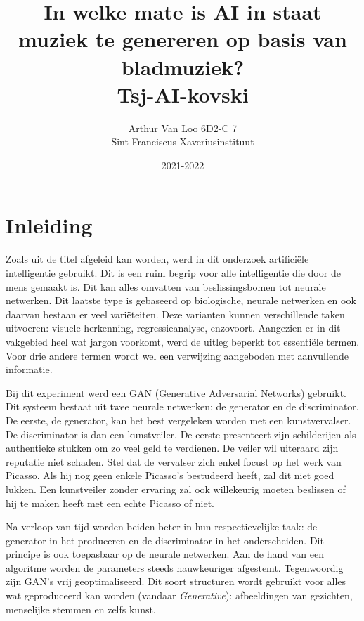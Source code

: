 \documentclass[dutch, twoside, a4paper, 10pt]{article}
\title{\vspace{75mm}In welke mate is AI in staat muziek te genereren op basis van bladmuziek? \\[1ex] \large Tsj-AI-kovski }
\author{\small Arthur Van Loo 6D2-C 7\\ \small Sint-Franciscus-Xaveriusinstituut}
\date{ \vspace{-5mm} \small 2021-2022}
\begin{document}
\LARGE \maketitle
\thispagestyle{empty}
\newpage
\mbox{}
\newpage
\normalsize

\tableofcontents

\newpage

\section{Inleiding}
\noindent
Zoals uit de titel afgeleid kan worden, werd in dit onderzoek artificiële intelligentie gebruikt. Dit is een ruim begrip voor alle intelligentie die door de mens gemaakt is. Dit kan alles omvatten van beslissingsbomen tot neurale netwerken. Dit laatste type is gebaseerd op biologische, neurale netwerken en ook daarvan bestaan er veel variëteiten. Deze varianten kunnen verschillende taken uitvoeren: visuele herkenning, regressieanalyse, enzovoort. Aangezien er in dit vakgebied heel wat jargon voorkomt, werd de uitleg beperkt tot essentiële termen. Voor drie andere termen wordt wel een verwijzing aangeboden met aanvullende informatie.
\par\bigskip\noindent
Bij dit experiment werd een GAN (Generative Adversarial Networks) gebruikt. Dit systeem bestaat uit twee neurale netwerken: de generator en de discriminator. De eerste, de generator, kan het best vergeleken worden met een kunstvervalser. De discriminator is dan een kunstveiler.  De eerste presenteert zijn schilderijen als authentieke stukken om zo veel geld te verdienen. De veiler wil uiteraard zijn reputatie niet schaden. Stel dat de vervalser zich enkel focust op het werk van Picasso. Als hij nog geen enkele Picasso's bestudeerd heeft, zal dit niet goed lukken. Een kunstveiler zonder ervaring zal ook willekeurig moeten beslissen of hij te maken heeft met een echte Picasso of niet. 
\par\bigskip\noindent
Na verloop van tijd worden beiden beter in hun respectievelijke taak: de generator in het produceren en de discriminator in het onderscheiden. Dit principe is ook toepasbaar op de neurale netwerken. Aan de hand van een algoritme worden de parameters steeds nauwkeuriger afgestemt. Tegenwoordig zijn GAN's vrij geoptimaliseerd. Dit soort structuren wordt gebruikt voor alles wat geproduceerd kan worden (vandaar \textit{Generative}): afbeeldingen van gezichten, menselijke stemmen en zelfs kunst.
\end{document}
